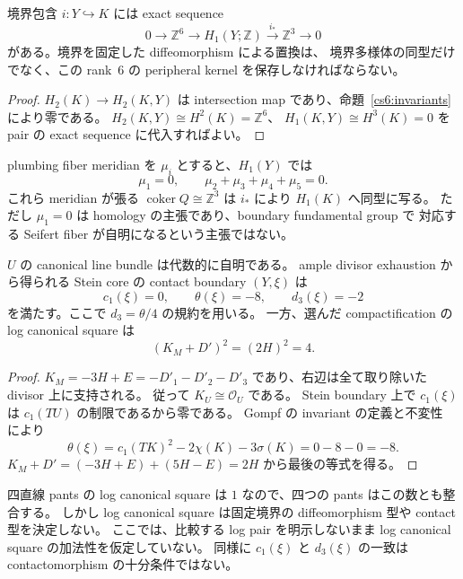 \begin{corollary}
\label{cs6:peripheral}
境界包含 $i:Y\hookrightarrow K$ には exact sequence
\begin{equation}
 0\longrightarrow\mathbb Z^6
 \longrightarrow H_1(Y;\mathbb Z)
 \xrightarrow{i_*}\mathbb Z^3\longrightarrow0
 \label{cs6:peripheralsequence}
\end{equation}
がある。境界を固定した diffeomorphism による置換は、
境界多様体の同型だけでなく、この rank~$6$ の peripheral kernel を保存しなければならない。
\end{corollary}

\begin{proof}
$H_2(K)\to H_2(K,Y)$ は intersection map であり、命題~\ref{cs6:invariants} により零である。
$H_2(K,Y)\cong H^2(K)=\mathbb Z^6$、
$H_1(K,Y)\cong H^3(K)=0$ を pair の exact sequence に代入すればよい。
\end{proof}

plumbing fiber meridian を $\mu_i$ とすると、$H_1(Y)$ では
\[
 \mu_1=0,\qquad\mu_2+\mu_3+\mu_4+\mu_5=0.
\]
これら meridian が張る $\operatorname{coker}Q\cong\mathbb Z^3$ は
$i_*$ により $H_1(K)$ へ同型に写る。
ただし $\mu_1=0$ は homology の主張であり、boundary fundamental group で
対応する Seifert fiber が自明になるという主張ではない。

\begin{proposition}
\label{cs6:contact}
$U$ の canonical line bundle は代数的に自明である。
ample divisor exhaustion から得られる Stein core の contact boundary $(Y,\xi)$ は
\[
 c_1(\xi)=0,\qquad
 \theta(\xi)=-8,\qquad d_3(\xi)=-2
\]
を満たす。ここで $d_3=\theta/4$ の規約を用いる。
一方、選んだ compactification の log canonical square は
\[
 (K_M+D')^2=(2H)^2=4.
\]
\end{proposition}

\begin{proof}
$K_M=-3H+E=-D'_1-D'_2-D'_3$ であり、右辺は全て取り除いた divisor 上に支持される。
従って $K_U\cong\mathcal O_U$ である。
Stein boundary 上で $c_1(\xi)$ は $c_1(TU)$ の制限であるから零である。
Gompf の invariant の定義と不変性
\cite[Definition~4.2, Theorem~4.5]{Gompf} により
\[
 \theta(\xi)=c_1(TK)^2-2\chi(K)-3\sigma(K)=0-8-0=-8.
\]
$K_M+D'=(-3H+E)+(5H-E)=2H$ から最後の等式を得る。
\end{proof}

四直線 pants の log canonical square は $1$ なので、四つの pants はこの数とも整合する。
しかし log canonical square は固定境界の diffeomorphism 型や contact 型を決定しない。
ここでは、比較する log pair を明示しないまま log canonical square の加法性を仮定していない。
同様に $c_1(\xi)$ と $d_3(\xi)$ の一致は contactomorphism の十分条件ではない。

